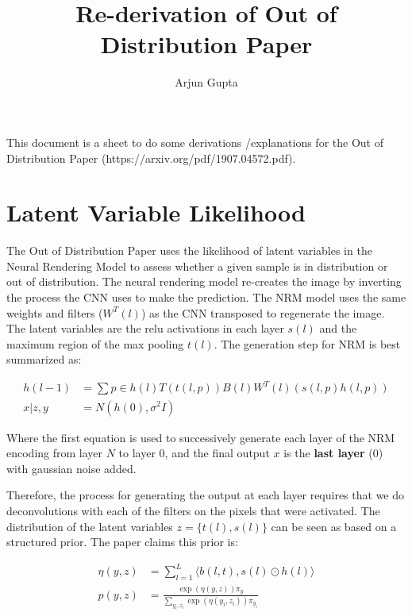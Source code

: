 \documentclass{report}
\title{Re-derivation of Out of Distribution Paper}
\author{Arjun Gupta}
\begin{document}
	\maketitle 
	
	This document is a sheet to do some derivations /explanations for the Out of Distribution Paper (https://arxiv.org/pdf/1907.04572.pdf).
	
	\section{Latent Variable Likelihood}
	The Out of Distribution Paper uses the likelihood of latent variables in the Neural Rendering Model to assess whether a given sample is in distribution or out of distribution. The neural rendering model re-creates the image by inverting the process the CNN uses to make the prediction. The NRM model uses the same weights and filters ($W^T(l)$) as the CNN transposed to regenerate the image. The latent variables are the relu activations in each layer $s(l)$ and the maximum region of the max pooling $t(l)$. The generation step for NRM is best summarized as:
	
	\begin{equation}
		\begin{split}
		h(l-1) &= \sum{p \in h(l)} T(t(l, p))B(l)W^T(l)(s(l, p) h(l, p))\\
		x | z, y &= N(h(0), \sigma^2I)
		\end{split}
	\end{equation}
	
	Where the first equation is used to successively generate each layer of the NRM encoding from layer $N$ to layer $0$, and the final output $x$ is the \textbf{last layer} ($0$) with gaussian noise added.
	
	Therefore, the process for generating the output at each layer requires that we do deconvolutions with each of the filters on the pixels that were activated. The distribution of the latent variables $z = \{t(l), s(l)\}$ can be seen as based on a structured prior. The paper claims this prior is:
	
	\begin{equation}
		\begin{split}
		\eta(y, z) &= \sum_{l=1}^{L} \langle b(l, t), s(l) \odot h(l) \rangle \\
	 	p(y, z) &= \frac{\exp \left(\eta(y, z)\right)\pi_y}
	 	{\sum_{y_i, z_i}\exp\left(\eta(y_i, z_i)\right)\pi_{y_i}} \\
	 	\end{split}
	\end{equation}
\end{document}
